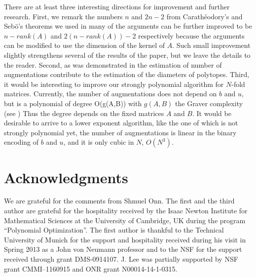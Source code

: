 \documentclass[moor]{informs1hack}              %
\begin{document}
There are at least three interesting directions for improvement and further research. First, we remark the numbers $n$ and $2n-2$ from Carath\'eodory's and Seb\"o's theorems we used in many of the arguments can be further improved to be $n-rank(A)$ and $2(n-rank(A))-2$ respectively because the arguments can be modified to use the dimension of the kernel of $A$. Such small improvement slightly strengthens several of the results of the paper, but we leave the details to the reader.
Second, as was demonstrated in \cite{circuitdiameter,manycircuitdiameters} the estimation of number of augmentations contribute to the 
estimation of the diameters of polytopes. Third, it would be interesting to improve our strongly polynomial algorithm for $N$-fold matrices.  
Currently, the number of augmentations does not depend on $b$ and $u$, but is a polynomial of degree O({g(A,B)}) with $g(A,B)$ the 
Graver complexity (see \cite{Hosten+Sullivant,Santos+Sturmfels, Berstein+Onn:09}) Thus the degree  depends on the fixed matrices $A$ and $B$.  
It would be desirable to arrive to a lower exponent  algorithm, like the one of \cite{hemmecke-onn-romanchuk:nfold-cubic} which is not  strongly 
polynomial yet, the number of augmentations is linear in  the binary encoding of $b$ and $u$, and it is only cubic in $N$, $O(N^3)$.

\section*{Acknowledgments} We are grateful for the comments from Shmuel Onn.  The first and the third author are grateful for the hospitality received by the Isaac Newton Institute for Mathematical Sciences at the University of Cambridge, UK during the program ``Polynomial Optimization''. The first author is thankful to the Technical University of Munich for the support and hospitality received during his visit in Spring 2013 as a John von Neumann professor and to the NSF for the support received through grant DMS-0914107. J. Lee was partially supported by NSF grant CMMI--1160915 and ONR grant N00014-14-1-0315.




\end{document}
